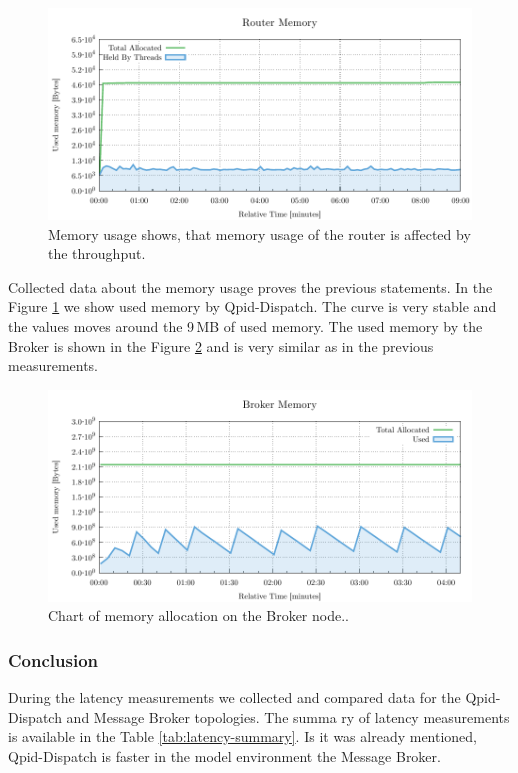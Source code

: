 \begin{figure}[H]
	\centering
	\includegraphics[width=1\linewidth]{obrazky-figures/charts/multipoint-router-only-latency-memory.pdf}
	\caption{Memory usage shows, that memory usage of the router is affected by the throughput.}
	\label{fig:latency-multiple-router-memory}
\end{figure}

Collected data about the memory usage proves the previous statements. In the Figure \ref{fig:latency-multiple-router-memory} we show used memory by Qpid-Dispatch. The curve is very stable and the values moves around the 9\,MB of used memory. The used memory by the Broker is shown in the Figure \ref{fig:latency-multiple-broker-memory} and is very similar as in the previous measurements.

\begin{figure}[H]
	\centering
	\includegraphics[width=1\linewidth]{obrazky-figures/charts/multipoint-router-broker-latency-memory.pdf}
	\caption{Chart of memory allocation on the Broker node..}
	\label{fig:latency-multiple-broker-memory}
\end{figure}

\subsubsection*{Conclusion}
During the latency measurements we collected and compared data for the Qpid-Dispatch and Message Broker topologies. The summa
ry of latency measurements is available in the Table \ref{tab:latency-summary}. Is it was already mentioned, Qpid-Dispatch is faster in the model environment the Message Broker.

